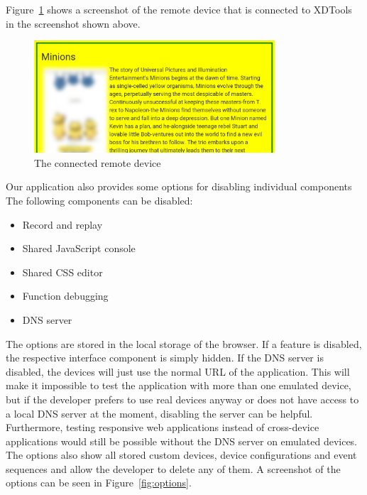 Figure~\ref{fig:complete_remote} shows a screenshot of the remote device that is connected to XDTools in the screenshot shown above.

\begin{figure}[H]
  \centering
    \includegraphics[width=0.8\textwidth]{images/screenshots/complete_remote_2.png}
	\caption[Screenshot: Remote Device]{The connected remote device}
	\label{fig:complete_remote}
\end{figure}

Our application also provides some options for disabling individual components The following components can be disabled:
\begin{itemize}
	\item Record and replay
	\item Shared JavaScript console
	\item Shared CSS editor
	\item Function debugging
	\item DNS server
\end{itemize}
The options are stored in the local storage of the browser. If a feature is disabled, the respective interface component is simply hidden. If the DNS server is disabled, the devices will just use the normal URL of the application. This will make it impossible to test the application with more than one emulated device, but if the developer prefers to use real devices anyway or does not have access to a local DNS server at the moment, disabling the server can be helpful. Furthermore, testing responsive web applications instead of cross-device applications would still be possible without the DNS server on emulated devices. The options also show all stored custom devices, device configurations and event sequences and allow the developer to delete any of them. A screenshot of the options can be seen in Figure~\ref{fig:options}.

